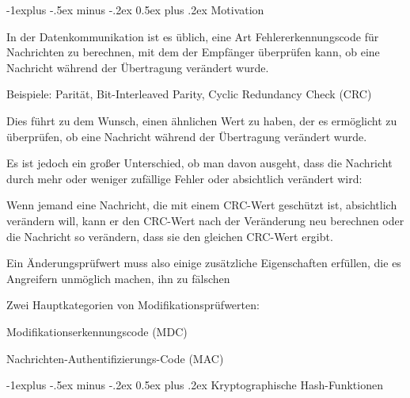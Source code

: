 \documentclass[a4paper]{article}
\makeatletter
\renewcommand{\subsection}{\@startsection{subsection}{2}{0mm}%
 {-1explus -.5ex minus -.2ex}%
 {0.5ex plus .2ex}%
 {\normalfont\normalsize\bfseries}}
\makeatother
\begin{document}
\begin{multicols}{3}
      \subsection{Motivation}

      \begin{itemize*}
            \item In der Datenkommunikation ist es üblich, eine Art Fehlererkennungscode
            für Nachrichten zu berechnen, mit dem der Empfänger überprüfen kann,
            ob eine Nachricht während der Übertragung verändert wurde.
            \begin{itemize*}
                  \item Beispiele: Parität, Bit-Interleaved Parity, Cyclic Redundancy Check (CRC)
            \end{itemize*}
            \item Dies führt zu dem Wunsch, einen ähnlichen Wert zu haben, der es
            ermöglicht zu überprüfen, ob eine Nachricht während der Übertragung
            verändert wurde.
            \item Es ist jedoch ein großer Unterschied, ob man davon ausgeht, dass die
            Nachricht durch mehr oder weniger zufällige Fehler oder absichtlich
            verändert wird:
            \begin{itemize*}
                  \item Wenn jemand eine Nachricht, die mit einem CRC-Wert geschützt ist, absichtlich verändern will, kann er den CRC-Wert nach der Veränderung neu berechnen oder die Nachricht so verändern, dass sie den gleichen CRC-Wert ergibt.
            \end{itemize*}
            \item Ein Änderungsprüfwert muss also einige zusätzliche Eigenschaften
            erfüllen, die es Angreifern unmöglich machen, ihn zu fälschen
            \begin{itemize*}
                  \item Zwei Hauptkategorien von Modifikationsprüfwerten:
                  \begin{itemize*} \item Modifikationserkennungscode (MDC) \item Nachrichten-Authentifizierungs-Code (MAC) \end{itemize*}
            \end{itemize*}
      \end{itemize*}


      \subsection{Kryptographische
            Hash-Funktionen}


\end{multicols}
\end{document}
